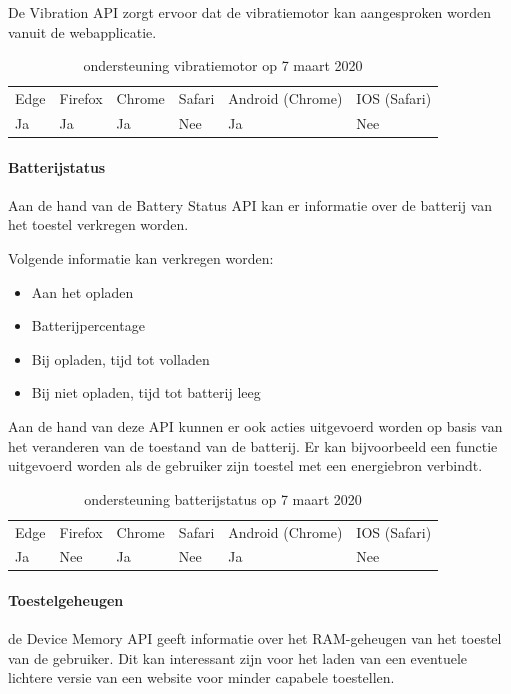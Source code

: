 De Vibration API \autocite{Kostionen2018} zorgt ervoor dat de vibratiemotor kan aangesproken worden vanuit de webapplicatie.

\begin{table}[H]
	\begin{tabular}{llllll}
		Edge & Firefox & Chrome & Safari & Android (Chrome) & IOS (Safari) \\
		Ja   & Ja      &  Ja     & Nee     & Ja               & Nee          
	\end{tabular}	
	\caption{ondersteuning vibratiemotor  op 7 maart 2020}
\end{table}


\paragraph{Batterijstatus}

Aan de hand van de Battery Status API \autocite{Kostiainen2016} kan er informatie over de batterij van het toestel verkregen worden.

Volgende informatie kan verkregen worden:
 \begin{itemize}
	\item	Aan het opladen
	\item	Batterijpercentage
	\item	Bij opladen, tijd tot volladen
	\item	Bij niet opladen, tijd tot batterij leeg
\end{itemize}

Aan de hand van deze API kunnen er ook acties uitgevoerd worden op basis van het veranderen van de toestand van de batterij. Er kan bijvoorbeeld een functie uitgevoerd worden als de gebruiker zijn toestel met een energiebron verbindt.

\begin{table}[H]
	\centering
	\begin{tabular}{llllll}
		Edge & Firefox & Chrome & Safari & Android (Chrome) & IOS (Safari) \\
		Ja   & Nee      &  Ja     & Nee     & Ja               & Nee          
	\end{tabular}	
	\caption{ondersteuning batterijstatus op 7 maart 2020 }
\end{table}

\paragraph{Toestelgeheugen}
de Device Memory API \autocite{Panicker2018} geeft informatie over het RAM-geheugen van het toestel van de gebruiker. Dit kan interessant zijn voor het laden van een eventuele lichtere versie van een website voor minder capabele toestellen.

